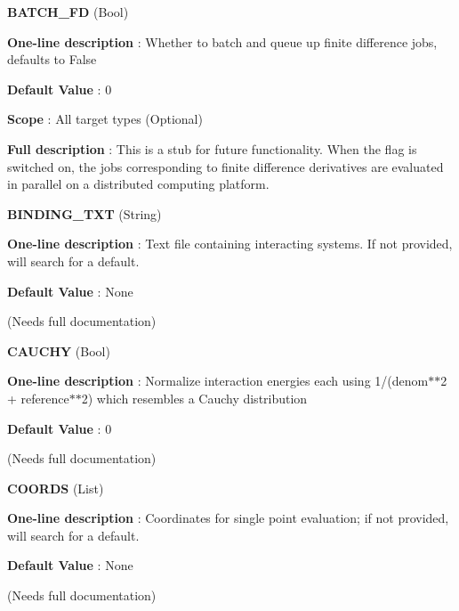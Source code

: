\begin{DoxyItemize}
\item {\bfseries  \-B\-A\-T\-C\-H\-\_\-\-F\-D } (\-Bool) \par
{\bfseries  \-One-\/line description }\-: \-Whether to batch and queue up finite difference jobs, defaults to \-False \par
{\bfseries  \-Default \-Value }\-: 0 \par
{\bfseries  \-Scope }\-: \-All target types (\-Optional) \par
{\bfseries  \-Full description }\-: \-This is a stub for future functionality. \-When the flag is switched on, the jobs corresponding to finite difference derivatives are evaluated in parallel on a distributed computing platform.\end{DoxyItemize}
\begin{DoxyItemize}
\item {\bfseries  \-B\-I\-N\-D\-I\-N\-G\-\_\-\-T\-X\-T } (\-String) \par
{\bfseries  \-One-\/line description }\-: \-Text file containing interacting systems. \-If not provided, will search for a default. \par
{\bfseries  \-Default \-Value }\-: \-None \par
(\-Needs full documentation)\end{DoxyItemize}
\begin{DoxyItemize}
\item {\bfseries  \-C\-A\-U\-C\-H\-Y } (\-Bool) \par
{\bfseries  \-One-\/line description }\-: \-Normalize interaction energies each using 1/(denom$\ast$$\ast$2 + reference$\ast$$\ast$2) which resembles a \-Cauchy distribution \par
{\bfseries  \-Default \-Value }\-: 0 \par
(\-Needs full documentation)\end{DoxyItemize}
\begin{DoxyItemize}
\item {\bfseries  \-C\-O\-O\-R\-D\-S } (\-List) \par
{\bfseries  \-One-\/line description }\-: \-Coordinates for single point evaluation; if not provided, will search for a default. \par
{\bfseries  \-Default \-Value }\-: \-None \par
(\-Needs full documentation)\end{DoxyItemize}
